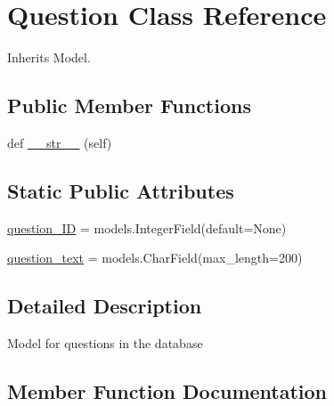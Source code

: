 \hypertarget{classdynamicfilterapp_1_1models_1_1_question}{}\section{Question Class Reference}
\label{classdynamicfilterapp_1_1models_1_1_question}


Inherits Model.

\subsection*{Public Member Functions}
\begin{DoxyCompactItemize}
\item 
def \mbox{\hyperlink{classdynamicfilterapp_1_1models_1_1_question_a23e8041ce1015febe4fdace3225714f9}{\+\_\+\+\_\+str\+\_\+\+\_\+}} (self)
\end{DoxyCompactItemize}
\subsection*{Static Public Attributes}
\begin{DoxyCompactItemize}
\item 
\mbox{\hyperlink{classdynamicfilterapp_1_1models_1_1_question_a4614954525e0499e3e5ae2de1f277ac8}{question\+\_\+\+ID}} = models.\+Integer\+Field(default=None)
\item 
\mbox{\hyperlink{classdynamicfilterapp_1_1models_1_1_question_a200d22e5ef377c5e3799614d9f9730f8}{question\+\_\+text}} = models.\+Char\+Field(max\+\_\+length=200)
\end{DoxyCompactItemize}


\subsection{Detailed Description}
\begin{DoxyVerb}Model for questions in the database
\end{DoxyVerb}
 

\subsection{Member Function Documentation}
\mbox{\label{classdynamicfilterapp_1_1models_1_1_question_a23e8041ce1015febe4fdace3225714f9}} 
